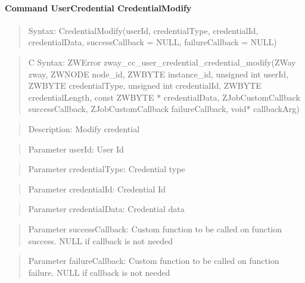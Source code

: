 \paragraph{Command UserCredential CredentialModify}
\begin{quote}Syntax: CredentialModify(userId, credentialType, credentialId, credentialData, successCallback = NULL, failureCallback = NULL)\end{quote}
\begin{quote}C Syntax: ZWError zway\_cc\_user\_credential\_credential\_modify(ZWay zway, ZWNODE node\_id, ZWBYTE instance\_id, unsigned int userId, ZWBYTE credentialType, unsigned int credentialId, ZWBYTE credentialLength, const ZWBYTE * credentialData, ZJobCustomCallback successCallback, ZJobCustomCallback failureCallback, void* callbackArg)\end{quote}
\begin{quote}Description: Modify credential\end{quote}
\begin{quote}Parameter userId: User Id\end{quote}
\begin{quote}Parameter credentialType: Credential type\end{quote}
\begin{quote}Parameter credentialId: Credential Id\end{quote}
\begin{quote}Parameter credentialData: Credential data\end{quote}
\begin{quote}Parameter successCallback: Custom function to be called on function success. NULL if callback is not needed\end{quote}
\begin{quote}Parameter failureCallback: Custom function to be called on function failure. NULL if callback is not needed\end{quote}


